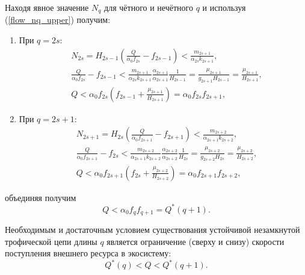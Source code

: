     Находя явное значение \(N_q\) для чётного и нечётного \(q\) и используя (\ref{flow_nq_upper}) получим:
    \begin{enumerate}
        \item При \(q = 2s\):
        \begin{equation}
            \begin{split}
                & N_{2s} = H_{2s-1} \left( \frac{Q}{\alpha_0 f_{2s}} - f_{2s-1} \right) < \frac{m_{2s+1}}{\alpha_{2s} k_{2s+1}}, \\
                & \frac{Q}{\alpha_0 f_{2s}} - f_{2s-1} < \frac{m_{2s+1}}{\alpha_{2s} k_{2s+1}} \frac{\alpha_{2s+1}}{\alpha_{2s+1}} \frac{1}{H_{2s-1}} = \frac{\mu_{2s+1}}{g_{2s+1} H_{2s-1}} = \frac{\mu_{2s+1}}{H_{2s+1}}, \\
                & Q < \alpha_0 f_{2s} \left(  f_{2s-1} + \frac{\mu_{2s+1}}{H_{2s+1}} \right) = \alpha_0 f_{2s} f_{2s+1},        
            \end{split}
        \end{equation}
        
        \item При \(q = 2s+1\):
        \begin{equation}
            \begin{split}
                & N_{2s+1} = H_{2s} \left( \frac{Q}{\alpha_0 f_{2s+1}} - f_{2s+1} \right) < \frac{m_{2s+2}}{\alpha_{2s+1} k_{2s+2}}, \\
                & \frac{Q}{\alpha_0 f_{2s+1}} - f_{2s} < \frac{m_{2s+2}}{\alpha_{2s+1} k_{2s+2}} \frac{\alpha_{2s+2}}{\alpha_{2s+2}} \frac{1}{H_{2s}} = \frac{\mu_{2s+2}}{g_{2s+2} H_{2s}} = \frac{\mu_{2s+2}}{H_{2s+2}}, \\
                & Q < \alpha_0 f_{2s+1} \left(  f_{2s} + \frac{\mu_{2s+2}}{H_{2s+2}} \right) = \alpha_0 f_{2s+1} f_{2s+2},      
            \end{split}
        \end{equation}
    \end{enumerate}
    объединяя получим
    \begin{equation}
        Q < \alpha_0 f_{q} f_{q+1} = Q^*(q+1).
    \end{equation}

    \begin{corollary}
        Необходимым и достаточным условием существования устойчивой незамкнутой трофической цепи длины \(q\) является ограничение (сверху и снизу) скорости поступления внешнего ресурса в экосистему:
        \begin{equation}
            Q^*(q) < Q < Q^*(q+1).
        \end{equation}
    \end{corollary}
